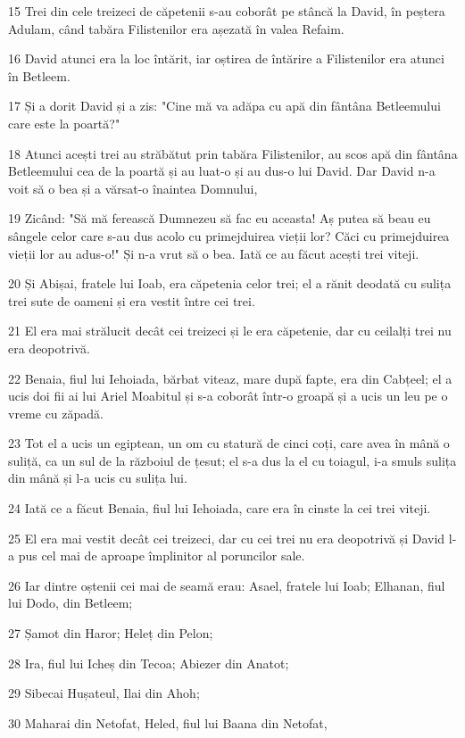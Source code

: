 \par 15 Trei din cele treizeci de căpetenii s-au coborât pe stâncă la David, în peștera Adulam, când tabăra Filistenilor era așezată în valea Refaim.
\par 16 David atunci era la loc întărit, iar oștirea de întărire a Filistenilor era atunci în Betleem.
\par 17 Și a dorit David și a zis: "Cine mă va adăpa cu apă din fântâna Betleemului care este la poartă?"
\par 18 Atunci acești trei au străbătut prin tabăra Filistenilor, au scos apă din fântâna Betleemului cea de la poartă și au luat-o și au dus-o lui David. Dar David n-a voit să o bea și a vărsat-o înaintea Domnului,
\par 19 Zicând: "Să mă ferească Dumnezeu să fac eu aceasta! Aș putea să beau eu sângele celor care s-au dus acolo cu primejduirea vieții lor? Căci cu primejduirea vieții lor au adus-o!" Și n-a vrut să o bea. Iată ce au făcut acești trei viteji.
\par 20 Și Abișai, fratele lui Ioab, era căpetenia celor trei; el a rănit deodată cu sulița trei sute de oameni și era vestit între cei trei.
\par 21 El era mai strălucit decât cei treizeci și le era căpetenie, dar cu ceilalți trei nu era deopotrivă.
\par 22 Benaia, fiul lui Iehoiada, bărbat viteaz, mare după fapte, era din Cabțeel; el a ucis doi fii ai lui Ariel Moabitul și s-a coborât într-o groapă și a ucis un leu pe o vreme cu zăpadă.
\par 23 Tot el a ucis un egiptean, un om cu statură de cinci coți, care avea în mână o suliță, ca un sul de la războiul de țesut; el s-a dus la el cu toiagul, i-a smuls sulița din mână și l-a ucis cu sulița lui.
\par 24 Iată ce a făcut Benaia, fiul lui Iehoiada, care era în cinste la cei trei viteji.
\par 25 El era mai vestit decât cei treizeci, dar cu cei trei nu era deopotrivă și David l-a pus cel mai de aproape împlinitor al poruncilor sale.
\par 26 Iar dintre oștenii cei mai de seamă erau: Asael, fratele lui Ioab; Elhanan, fiul lui Dodo, din Betleem;
\par 27 Șamot din Haror; Heleț din Pelon;
\par 28 Ira, fiul lui Icheș din Tecoa; Abiezer din Anatot;
\par 29 Sibecai Hușateul, Ilai din Ahoh;
\par 30 Maharai din Netofat, Heled, fiul lui Baana din Netofat,
